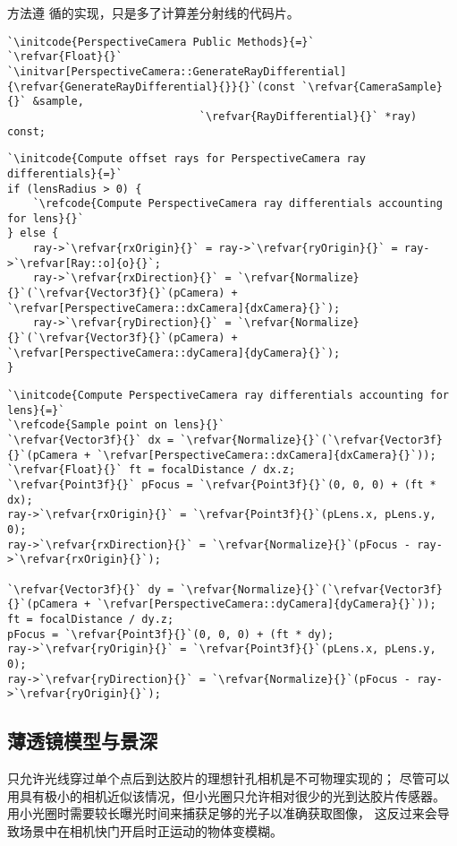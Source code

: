 方法遵
循的实现，只是多了计算差分射线的代码片。
\begin{lstlisting}
`\initcode{PerspectiveCamera Public Methods}{=}`
`\refvar{Float}{}` `\initvar[PerspectiveCamera::GenerateRayDifferential]{\refvar{GenerateRayDifferential}{}}{}`(const `\refvar{CameraSample}{}` &sample,
                              `\refvar{RayDifferential}{}` *ray) const;
\end{lstlisting}
\begin{lstlisting}
`\initcode{Compute offset rays for PerspectiveCamera ray differentials}{=}`
if (lensRadius > 0) {
    `\refcode{Compute PerspectiveCamera ray differentials accounting for lens}{}`
} else {
    ray->`\refvar{rxOrigin}{}` = ray->`\refvar{ryOrigin}{}` = ray->`\refvar[Ray::o]{o}{}`;
    ray->`\refvar{rxDirection}{}` = `\refvar{Normalize}{}`(`\refvar{Vector3f}{}`(pCamera) + `\refvar[PerspectiveCamera::dxCamera]{dxCamera}{}`);
    ray->`\refvar{ryDirection}{}` = `\refvar{Normalize}{}`(`\refvar{Vector3f}{}`(pCamera) + `\refvar[PerspectiveCamera::dyCamera]{dyCamera}{}`);
}
\end{lstlisting}
\begin{lstlisting}
`\initcode{Compute PerspectiveCamera ray differentials accounting for lens}{=}`
`\refcode{Sample point on lens}{}`
`\refvar{Vector3f}{}` dx = `\refvar{Normalize}{}`(`\refvar{Vector3f}{}`(pCamera + `\refvar[PerspectiveCamera::dxCamera]{dxCamera}{}`));
`\refvar{Float}{}` ft = focalDistance / dx.z;
`\refvar{Point3f}{}` pFocus = `\refvar{Point3f}{}`(0, 0, 0) + (ft * dx);
ray->`\refvar{rxOrigin}{}` = `\refvar{Point3f}{}`(pLens.x, pLens.y, 0);
ray->`\refvar{rxDirection}{}` = `\refvar{Normalize}{}`(pFocus - ray->`\refvar{rxOrigin}{}`);

`\refvar{Vector3f}{}` dy = `\refvar{Normalize}{}`(`\refvar{Vector3f}{}`(pCamera + `\refvar[PerspectiveCamera::dyCamera]{dyCamera}{}`));
ft = focalDistance / dy.z;
pFocus = `\refvar{Point3f}{}`(0, 0, 0) + (ft * dy);
ray->`\refvar{ryOrigin}{}` = `\refvar{Point3f}{}`(pLens.x, pLens.y, 0);
ray->`\refvar{ryDirection}{}` = `\refvar{Normalize}{}`(pFocus - ray->`\refvar{ryOrigin}{}`);
\end{lstlisting}

\subsection{薄透镜模型与景深}\label{sub:薄透镜模型与景深}
只允许光线穿过单个点后到达胶片的理想针孔相机是不可物理实现的；
尽管可以用具有极小的相机近似该情况，但小光圈只允许相对很少的光到达胶片传感器。
用小光圈时需要较长曝光时间来捕获足够的光子以准确获取图像，
这反过来会导致场景中在相机快门开启时正运动的物体变模糊。

